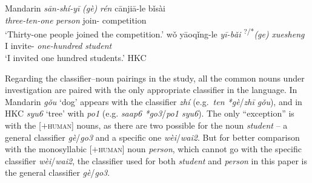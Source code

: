 \documentclass[output=paper]{langsci/langscibook}
\begin{document}
\ea\label{ex:23.6} Mandarin %
	\ea
        \gll    \textit{sān-shí-yī} \textit{(gè)} \textit{rén} cānjiā-le bǐsài\\
                \textit{three-ten-one} \hphantom{\textit{(}}\textit{\Clf}{} \textit{person} join-\Pfv{} competition\\
	    \glt    ‘Thirty-one people joined the competition.’
	\ex
        \gll    wǒ yāoqǐng-le \textit{yī-bǎi} \textsuperscript{?/*}\textit{(ge)} \textit{xuesheng}\\
                I  invite-\Pfv{} \textit{one-hundred} \textit{\Clf} \textit{student}\\
	    \glt    ‘I invited one hundred students.’
	\z
\ex \label{ex:23.7} \gls{HKC} %
	\z
\z

Regarding the classifier--noun pairings in the study, all the common nouns
under investigation are paired with the only appropriate
classifier in the language. In Mandarin \emph{gǒu}
‘dog’ appears with the classifier \emph{zhí} (e.g.\ \emph{ten
*gè}/\emph{zhī gǒu}), and in \gls{HKC} \emph{syu6}
‘tree’ with \emph{po1} (e.g. \emph{saap6 *go3}/\emph{po1 syu6}). The only
\enquote{exception} is with the [$+$\textsc{human}] nouns, as there are two
possible  for the noun \emph{student} -- a general classifier
\emph{gè}/\emph{go3} and a specific one \emph{wèi}/\emph{wai2}. But for better
comparison with the monosyllabic [$+$\textsc{human}] noun \emph{person}, which
cannot go with the specific classifier \emph{wèi}/\emph{wai2},
the classifier used for both \emph{student} and \emph{person}
in this paper is the general classifier \emph{gè}/\emph{go3}.
\end{document}

